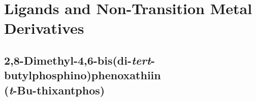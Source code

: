 
\section{Ligands and Non-Transition Metal Derivatives}
\label{section:experimental:ligands}


\subsection*{2,8-Dimethyl-4,6-bis(di-\emph{tert}-butylphosphino)phenoxathiin \\(\emph{t}-Bu-thixantphos)}


